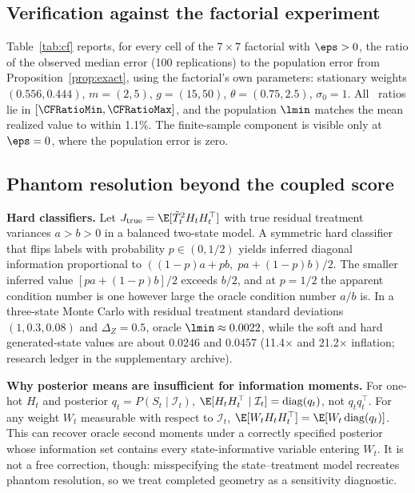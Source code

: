 \subsection{Verification against the factorial experiment}
\label{app:factorial_cf}
Table~\ref{tab:cf} reports, for every cell of the $7\times7$ factorial with $\eps>0$, the ratio of the observed median error (100 replications) to the population error from Proposition~\ref{prop:exact}, using the factorial's own parameters: stationary weights $(0.556,0.444)$, $m=(2,5)$, $g=(15,50)$, $\theta=(0.75,2.5)$, $\sigma_0=1$. All \CFNCells\ ratios lie in $[\CFRatioMin,\CFRatioMax]$, and the population $\lmin$ matches the mean realized value to within 1.1\%. The finite-sample component is visible only at $\eps=0$, where the population error is zero.
\begin{table}[h]
\centering\footnotesize
\caption{Observed median error divided by the exact population error (Proposition~\ref{prop:exact}), factorial design.}
\label{tab:cf}

\end{table}

\subsection{Phantom resolution beyond the coupled score}
\label{app:phantom_more}
\textbf{Hard classifiers.} Let $J_{\rm true}=\E[\tilde T_t^2H_tH_t^\top]$ with true residual treatment variances $a>b>0$ in a balanced two-state model. A symmetric hard classifier that flips labels with probability $p\in(0,1/2)$ yields inferred diagonal information proportional to $((1-p)a+pb,\;pa+(1-p)b)/2$. The smaller inferred value $[pa+(1-p)b]/2$ exceeds $b/2$, and at $p=1/2$ the apparent condition number is one however large the oracle condition number $a/b$ is. In a three-state Monte Carlo with residual treatment standard deviations $(1,0.3,0.08)$ and $\Delta_Z=0.5$, oracle $\lmin\approx0.0022$, while the soft and hard generated-state values are about $0.0246$ and $0.0457$ (11.4$\times$ and 21.2$\times$ inflation; research ledger in the supplementary archive).

\textbf{Why posterior means are insufficient for information moments.} For one-hot $H_t$ and posterior $q_t=P(S_t\mid\mathcal I_t)$, $\E[H_tH_t^\top\mid\mathcal I_t]=\operatorname{diag}(q_t)$, not $q_tq_t^\top$. For any weight $W_t$ measurable with respect to $\mathcal I_t$, $\E[W_tH_tH_t^\top]=\E[W_t\operatorname{diag}(q_t)]$. This can recover oracle second moments under a correctly specified posterior whose information set contains every state-informative variable entering $W_t$. It is not a free correction, though: misspecifying the state--treatment model recreates phantom resolution, so we treat completed geometry as a sensitivity diagnostic.

